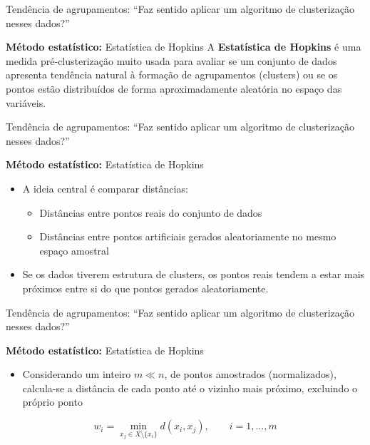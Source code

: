 \documentclass[
  ignorenonframetext,
  aspectratio=169,
]{beamer}
\providecommand{\tightlist}{%
  \setlength{\itemsep}{0pt}\setlength{\parskip}{0pt}}
\begin{document}
\begin{frame}{Tendência de agrupamentos: ``Faz sentido aplicar um
algoritmo de clusterização nesses dados?''}
\protect{}\label{tenduxeancia-de-agrupamentos-faz-sentido-aplicar-um-algoritmo-de-clusterizauxe7uxe3o-nesses-dados}
\begin{block}{\textbf{Método estatístico:} Estatística de Hopkins}
\protect{}\label{muxe9todo-estatuxedstico-estatuxedstica-de-hopkins}
A \textbf{Estatística de Hopkins} é uma medida pré-clusterização muito
usada para avaliar se um conjunto de dados apresenta tendência natural à
formação de agrupamentos (clusters) ou se os pontos estão distribuídos
de forma aproximadamente aleatória no espaço das variáveis.
\end{block}
\end{frame}

\begin{frame}{Tendência de agrupamentos: ``Faz sentido aplicar um
algoritmo de clusterização nesses dados?''}
\protect{}\label{tenduxeancia-de-agrupamentos-faz-sentido-aplicar-um-algoritmo-de-clusterizauxe7uxe3o-nesses-dados-1}
\begin{block}{\textbf{Método estatístico:} Estatística de Hopkins}
\protect{}\label{muxe9todo-estatuxedstico-estatuxedstica-de-hopkins-1}
\begin{itemize}
\tightlist
\item
  A ideia central é comparar distâncias:

  \begin{itemize}
  \tightlist
  \item
    Distâncias entre pontos reais do conjunto de dados
  \item
    Distâncias entre pontos artificiais gerados aleatoriamente no mesmo
    espaço amostral
  \end{itemize}
\item
  Se os dados tiverem estrutura de clusters, os pontos reais tendem a
  estar mais próximos entre si do que pontos gerados aleatoriamente.
\end{itemize}
\end{block}
\end{frame}

\begin{frame}{Tendência de agrupamentos: ``Faz sentido aplicar um
algoritmo de clusterização nesses dados?''}
\protect{}\label{tenduxeancia-de-agrupamentos-faz-sentido-aplicar-um-algoritmo-de-clusterizauxe7uxe3o-nesses-dados-2}
\begin{block}{\textbf{Método estatístico:} Estatística de Hopkins}
\protect{}\label{muxe9todo-estatuxedstico-estatuxedstica-de-hopkins-2}
\begin{itemize}
\tightlist
\item
  Considerando um inteiro \(m \ll n\), de pontos amostrados
  (normalizados), calcula-se a distância de cada ponto até o vizinho
  mais próximo, excluindo o próprio ponto
\end{itemize}

\[
w_i
=
\min_{x_j \in X \setminus \{x_i\}}
d(x_i, x_j),
\qquad i = 1,\ldots,m
\]
\end{block}
\end{frame}
\end{document}
